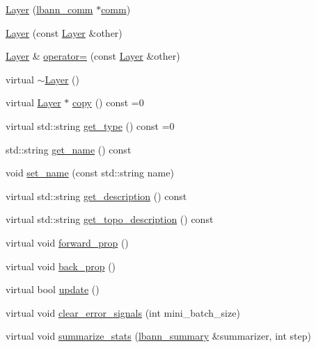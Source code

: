 \begin{DoxyCompactItemize}
\item 
\hyperlink{classlbann_1_1Layer_a24e9c82354a0a2af1b70cbca2211e7d4}{Layer} (\hyperlink{classlbann_1_1lbann__comm}{lbann\+\_\+comm} $\ast$\hyperlink{file__io_8cpp_ab048c6f9fcbcfaa57ce68b00263dbebe}{comm})
\item 
\hyperlink{classlbann_1_1Layer_a247cc68c730284f10a2cb42985fe5f3a}{Layer} (const \hyperlink{classlbann_1_1Layer}{Layer} \&other)
\item 
\hyperlink{classlbann_1_1Layer}{Layer} \& \hyperlink{classlbann_1_1Layer_a00d8acde68fda2f38c4a39ef8c89234a}{operator=} (const \hyperlink{classlbann_1_1Layer}{Layer} \&other)
\item 
virtual \hyperlink{classlbann_1_1Layer_a68c3f57587956da938406812f13ecb78}{$\sim$\+Layer} ()
\item 
virtual \hyperlink{classlbann_1_1Layer}{Layer} $\ast$ \hyperlink{classlbann_1_1Layer_af420f22bbac801c85483ade84588a23f}{copy} () const =0
\item 
virtual std\+::string \hyperlink{classlbann_1_1Layer_a0fa0ea9160b490c151c0a17fde4f7239}{get\+\_\+type} () const =0
\item 
std\+::string \hyperlink{classlbann_1_1Layer_a80027550202fa7dbb1dd55fa8a66c84b}{get\+\_\+name} () const
\item 
void \hyperlink{classlbann_1_1Layer_a82d8a038861b0af0d54fbf44ce715839}{set\+\_\+name} (const std\+::string name)
\item 
virtual std\+::string \hyperlink{classlbann_1_1Layer_acc0803d3428914ca1eb5988c4309174a}{get\+\_\+description} () const
\item 
virtual std\+::string \hyperlink{classlbann_1_1Layer_a147a7f7dcf0027a60f10109439e5dcea}{get\+\_\+topo\+\_\+description} () const
\item 
virtual void \hyperlink{classlbann_1_1Layer_a2483ccd8a4406a6891f6176f1001b4e5}{forward\+\_\+prop} ()
\item 
virtual void \hyperlink{classlbann_1_1Layer_a0a502d9218d7dbbfd10ebebb6f917033}{back\+\_\+prop} ()
\item 
virtual bool \hyperlink{classlbann_1_1Layer_ae4a050e51e3a9bec431cf8b7a5660f2c}{update} ()
\item 
virtual void \hyperlink{classlbann_1_1Layer_aa1389a70b804debaac6953b3b1147593}{clear\+\_\+error\+\_\+signals} (int mini\+\_\+batch\+\_\+size)
\item 
virtual void \hyperlink{classlbann_1_1Layer_a7f3f26e2ae0497f9a00fd6bc56b50543}{summarize\+\_\+stats} (\hyperlink{classlbann_1_1lbann__summary}{lbann\+\_\+summary} \&summarizer, int step)

\end{DoxyCompactItemize}
